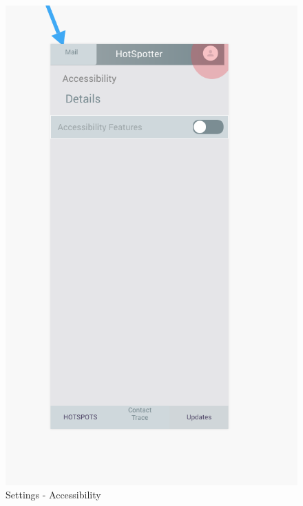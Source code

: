 \documentclass{scrreprt}
\begin{document}
\begin{figure}[H]
	\centering
	\includegraphics[page=1, width=0.9\linewidth]{COMP30830-Accessibility}
	\caption{Settings - Accessibility}
	\label{Access}
\end{figure}
\end{document}
